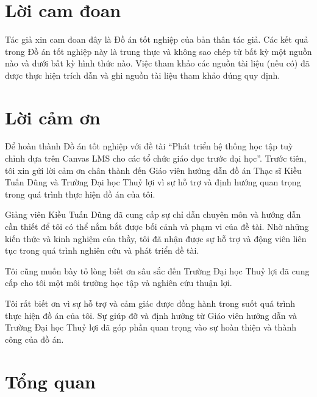 \documentclass[a4paper,12pt,oneside]{report}
\title{\bf \TITLE}
\author{\AUTHOR}
\theoremstyle{definition}
\begin{document}
\restoregeometry


\chapter*{Lời cam đoan}

Tác giả xin cam đoan đây là Đồ án tốt nghiệp của bản thân tác giả. Các kết quả trong Đồ án tốt nghiệp này là trung thực và không sao chép từ bất kỳ một nguồn nào và dưới bất kỳ hình thức nào. Việc tham khảo các nguồn tài liệu (nếu có) đã được thực hiện trích dẫn và ghi nguồn tài liệu tham khảo đúng quy định.
\newpage

\chapter*{Lời cảm ơn}

Để hoàn thành Đồ án tốt nghiệp với đề tài “Phát triển hệ thống học tập tuỳ chỉnh dựa trên Canvas LMS cho các tổ chức giáo dục trước đại học”. Trước tiên, tôi xin gửi lời cảm ơn chân thành đến Giáo viên hướng dẫn đồ án Thạc sĩ Kiều Tuấn Dũng và Trường Đại học Thuỷ lợi vì sự hỗ trợ và định hướng quan trọng trong quá trình thực hiện đồ án của tôi.

Giảng viên Kiều Tuấn Dũng đã cung cấp sự chỉ dẫn chuyên môn và hướng dẫn cần thiết để tôi có thể nắm bắt được bối cảnh và phạm vi của đề tài. Nhờ những kiến thức và kinh nghiệm của thầy, tôi đã nhận được sự hỗ trợ và động viên liên tục trong quá trình nghiên cứu và phát triển đề tài.

Tôi cũng muốn bày tỏ lòng biết ơn sâu sắc đến Trường Đại học Thuỷ lợi đã cung cấp cho tôi một môi trường học tập và nghiên cứu thuận lợi.

Tôi rất biết ơn vì sự hỗ trợ và cảm giác được đồng hành trong suốt quá trình thực hiện đồ án của tôi. Sự giúp đỡ và định hướng từ Giáo viên hướng dẫn và Trường Đại học Thuỷ lợi đã góp phần quan trọng vào sự hoàn thiện và thành công của đồ án.

\pagestyle{empty} %
\newpage
\tableofcontents %

\listoffigures %

\glsaddall

\newpage
\pagestyle{fancy} %
\chapter{Tổng quan}

\end{document}
